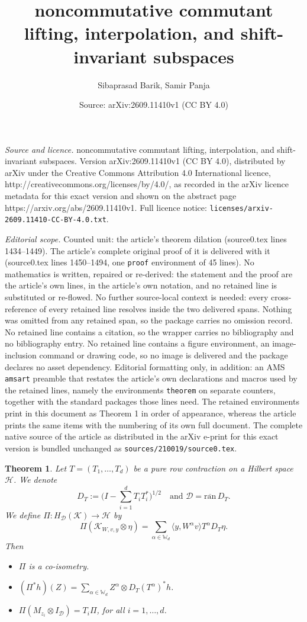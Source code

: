 \documentclass[10pt,a4paper]{amsart}
\title{noncommutative commutant lifting, interpolation, and shift-invariant subspaces}
\author{Sibaprasad Barik, Samir Panja}
\date{Source: arXiv:2609.11410v1 (CC BY 4.0)}
\newtheorem{theorem}{Theorem}
\newcommand{\bW}{\mathbb{W}}
\newcommand{\cld}{\mathcal{D}}
\newcommand{\clh}{\mathcal{H}}
\newcommand{\clk}{\mathcal{K}}
\newcommand\la{{\langle }}
\newcommand\ra{{\rangle}}
\begin{document}
\maketitle

\noindent\emph{Source and licence.} noncommutative commutant lifting, interpolation, and shift-invariant subspaces. Version arXiv:2609.11410v1 (CC BY 4.0), distributed by arXiv under the Creative Commons Attribution 4.0 International licence, http://creativecommons.org/licenses/by/4.0/, as recorded in the arXiv licence metadata for this exact version and shown on the abstract page https://arxiv.org/abs/2609.11410v1. Full licence notice: \texttt{licenses/arxiv-2609.11410-CC-BY-4.0.txt}.\par\smallskip

\noindent\textit{Editorial scope.} Counted unit: the article's theorem dilation (source0.tex lines 1434--1449). The article's complete original proof of it is delivered with it (source0.tex lines 1450--1494, one \texttt{proof} environment of 45 lines). No mathematics is written, repaired or re-derived: the statement and the proof are the article's own lines, in the article's own notation, and no retained line is substituted or re-flowed.  No further source-local context is needed: every cross-reference of every retained line resolves inside the two delivered spans.  Nothing was omitted from any retained span, so the package carries no omission record.  No retained line contains a citation, so the wrapper carries no bibliography and no bibliography entry.  No retained line contains a figure environment, an image-inclusion command or drawing code, so no image is delivered and the package declares no asset dependency.  Editorial formatting only, in addition: an AMS \texttt{amsart} preamble that restates the article's own declarations and macros used by the retained lines, namely the environments \texttt{theorem} on separate counters, together with the standard packages those lines need.  The retained environments print in this document as Theorem 1 in order of appearance, whereas the article prints the same items with the numbering of its own full document.  The complete native source of the article as distributed in the arXiv e-print for this exact version is bundled unchanged as \texttt{sources/210019/source0.tex}.
\begin{theorem}\label{dilation}
Let $T=(T_1,\ldots,T_d)$ be a pure row contraction on a Hilbert space $\clh$. We denote
\[
D_T:=\Big( I-\sum_{i=1}^d T_iT_i^*\Big)^{1/2}\quad \text{and}\,\,\cld=\overline{\text{ran}}\,D_T.
\]
We define $\Pi:H_{\cld}(\clk)\to\clh$  by
\begin{equation}\label{Pi}
\Pi(\clk_{W,v,y}\otimes\eta)=\sum_{\alpha\in \bW_d}\la y,W^\alpha v\ra T^\alpha D_T\eta.
\end{equation}
Then 
\begin{itemize}
\item[(i)] $\Pi$ is a co-isometry.
\item[(ii)] $(\Pi^*h)(Z)=\sum_{\alpha\in\bW_d}Z^{\alpha}\otimes D_T(T^{\alpha})^*h$.
\item[(iii)] $\Pi(M_{z_i}\otimes I_{\cld})=T_i\Pi$, for all $i=1,\ldots,d$.
\end{itemize}
\end{theorem}
\end{document}
